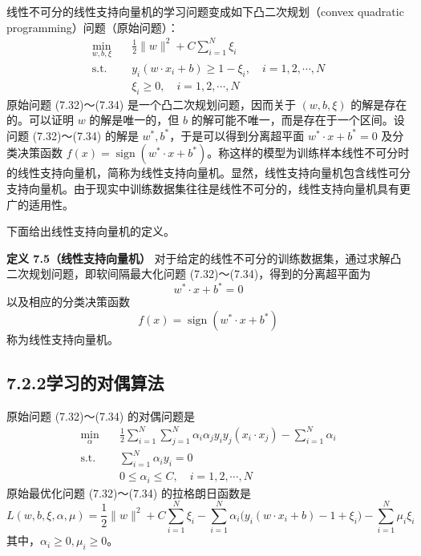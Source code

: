 \documentclass[UTF8, 12pt, fontset=fandol, oneside]{ctexart}
\begin{document}
线性不可分的线性支持向量机的学习问题变成如下凸二次规划（convex quadratic programming）问题（原始问题）：
\begin{equation}
\begin{aligned}
\min_{w,b,\xi}\quad & \frac{1}{2}\|w\|^2+C\sum_{i=1}^N\xi_i\\
\mathrm{s.t.}\quad & y_i(w\cdot x_i+b)\geq 1-\xi_i,\quad i=1,2,\cdots,N\\
& \xi_i\geq 0,\quad i=1,2,\cdots,N
\end{aligned}
\tag{7.32--7.34}
\end{equation}
原始问题 (7.32)～(7.34) 是一个凸二次规划问题，因而关于 $(w,b,\xi)$ 的解是存在的。可以证明 $w$ 的解是唯一的，但 $b$ 的解可能不唯一，而是存在于一个区间。设问题 (7.32)～(7.34) 的解是 $w^*,b^*$，于是可以得到分离超平面 $w^*\cdot x+b^*=0$ 及分类决策函数 $f(x)=\operatorname{sign}(w^*\cdot x+b^*)$。称这样的模型为训练样本线性不可分时的线性支持向量机，简称为线性支持向量机。显然，线性支持向量机包含线性可分支持向量机。由于现实中训练数据集往往是线性不可分的，线性支持向量机具有更广的适用性。

下面给出线性支持向量机的定义。

\noindent\textbf{定义 7.5（线性支持向量机）}\quad
对于给定的线性不可分的训练数据集，通过求解凸二次规划问题，即软间隔最大化问题 (7.32)～(7.34)，得到的分离超平面为
\begin{equation}
w^*\cdot x+b^*=0
\tag{7.35}
\end{equation}
以及相应的分类决策函数
\begin{equation}
f(x)=\operatorname{sign}(w^*\cdot x+b^*)
\tag{7.36}
\end{equation}
称为线性支持向量机。

\subsection*{7.2.2\quad 学习的对偶算法}

原始问题 (7.32)～(7.34) 的对偶问题是
\begin{equation}
\begin{aligned}
\min_\alpha\quad & \frac{1}{2}\sum_{i=1}^N\sum_{j=1}^N\alpha_i\alpha_j y_i y_j(x_i\cdot x_j)-\sum_{i=1}^N\alpha_i\\
\mathrm{s.t.}\quad & \sum_{i=1}^N\alpha_i y_i=0\\
& 0\leq \alpha_i\leq C,\quad i=1,2,\cdots,N
\end{aligned}
\tag{7.37--7.39}
\end{equation}
原始最优化问题 (7.32)～(7.34) 的拉格朗日函数是
\begin{equation}
L(w,b,\xi,\alpha,\mu)=\frac{1}{2}\|w\|^2+C\sum_{i=1}^N\xi_i-\sum_{i=1}^N\alpha_i\bigl(y_i(w\cdot x_i+b)-1+\xi_i\bigr)-\sum_{i=1}^N\mu_i\xi_i
\tag{7.40}
\end{equation}
其中，$\alpha_i\geq 0,\mu_i\geq 0$。
\end{document}
